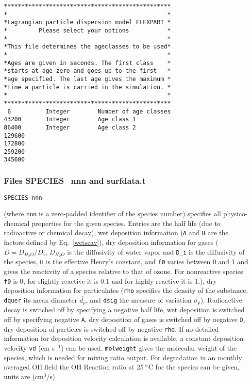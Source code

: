 \documentclass{egu}            %
\newcommand{\degreee}{{$\, \rm ^{\circ}$}}
\begin{document}
\begin{footnotesize}\begin{verbatim}
************************************************
*                                              *
*Lagrangian particle dispersion model FLEXPART *
*         Please select your options           *
*                                              *
*This file determines the ageclasses to be used*
*                                              *
*Ages are given in seconds. The first class    *
*starts at age zero and goes up to the first   *
*age specified. The last age gives the maximum *
*time a particle is carried in the simulation. *
*                                              *
************************************************
 6          Integer        Number of age classes
43200       Integer        Age class 1
86400       Integer        Age class 2
129600
172800
259200
345600
\end{verbatim}\end{footnotesize}

\newpage

\subsubsection{Files SPECIES\_nnn and surfdata.t}

\begin{footnotesize}\verb|SPECIES_nnn|\end{footnotesize} (where \verb|nnn| is 
a zero-padded identifier of the species number) specifies all physico-chemical
properties for the given species.  Entries are the half life (due to
radioactive or chemical decay), wet deposition information (\verb|A| and \verb|B| are the
factors defined by Eq.~\ref{wetscav}), dry deposition information for
gases ($D=D_{H_2O}/D_i$, $D_{H_2O}$ is the diffusivity of water vapor and \verb|D_i|
is the diffusivity of the species, \verb|H| is the effective Henry's constant, and
\verb|f0| varies between 0 and 1 and gives the reactivity of a species relative to
that of ozone.  For nonreactive species \verb|f0| is 0, for slightly reactive it is
0.1 and for highly reactive it is 1.), dry deposition information for
particulates (\verb|rho| specifies the density of the substance, \verb|dquer| its mean
diameter $\overline{d_p}$, and \verb|dsig| the measure of variation $\sigma_p$).
Radioactive decay is switched off by specifying a negative half life, wet
deposition is switched off by specifying negative \verb|A|, dry deposition of gases
is switched off by negative \verb|D|, dry deposition of particles is switched off by
negative \verb|rho|.  If no detailed information for deposition velocity calculation
is available, a constant deposition velocity \verb|vd| (cm s$^{-1}$) can be used.
\verb|molweight| gives the molecular weight of the species, which is needed for
mixing ratio output.  For degradation in an monthly averaged OH field
\citep{bey2001} the OH Reaction ratio at 25\degreee C for the species can be given,
units are (cm$^3$/s).
\end{document}

